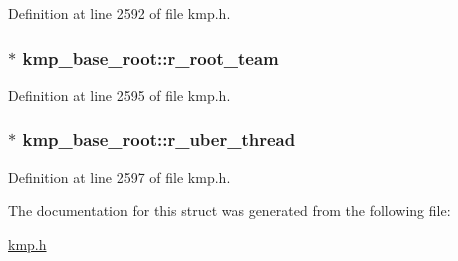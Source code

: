 Definition at line 2592 of file kmp.\-h.

\hypertarget{structkmp__base__root_a908942350716cff98181b1eed8c19d9c}{
\subsubsection[{r\-\_\-root\-\_\-team}]{$\ast$ kmp\-\_\-base\-\_\-root\-::r\-\_\-root\-\_\-team}}\label{structkmp__base__root_a908942350716cff98181b1eed8c19d9c}


Definition at line 2595 of file kmp.\-h.

\hypertarget{structkmp__base__root_a8cfa85b2b03f0b7319a8dae9e2e31032}{
\subsubsection[{r\-\_\-uber\-\_\-thread}]{$\ast$ kmp\-\_\-base\-\_\-root\-::r\-\_\-uber\-\_\-thread}}\label{structkmp__base__root_a8cfa85b2b03f0b7319a8dae9e2e31032}


Definition at line 2597 of file kmp.\-h.



The documentation for this struct was generated from the following file\-:\begin{DoxyCompactItemize}
\item 
\hyperlink{kmp_8h}{kmp.\-h}\end{DoxyCompactItemize}
